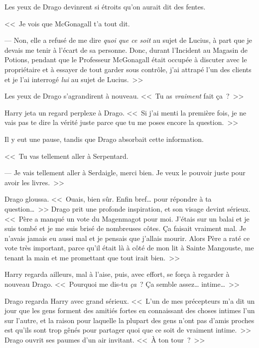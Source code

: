 Les yeux de Drago devinrent si étroits qu'on aurait dit des fentes.

<<~Je vois que McGonagall t'a tout dit.

--- Non, elle a refusé de me dire \emph{quoi que ce soit} au sujet de Lucius, à part que je devais me tenir à l'écart de sa personne. Donc, durant l'Incident au Magasin de Potions, pendant que le Professeur McGonagall était occupée à discuter avec le propriétaire et à essayer de tout garder sous contrôle, j'ai attrapé l'un des clients et je l'ai interrogé \emph{lui} au sujet de Lucius.~>>

Les yeux de Drago s'agrandirent à nouveau. <<~Tu as \emph{vraiment} fait ça~?~>>

Harry jeta un regard perplexe à Drago. <<~Si j'ai menti la première fois, je ne vais pas te dire la vérité juste parce que tu me poses encore la question.~>>

Il y eut une pause, tandis que Drago absorbait cette information.

<<~Tu vas tellement aller à Serpentard.

--- Je vais tellement aller à Serdaigle, merci bien. Je veux le pouvoir juste pour avoir les livres.~>>

Drago gloussa. <<~Ouais, bien sûr. Enfin bref… pour répondre à ta question…~>> Drago prit une profonde inspiration, et son visage devint sérieux. <<~Père a manqué un vote du Magenmagot pour moi. J'étais sur un balai et je suis tombé et je me suis brisé de nombreuses côtes. Ça faisait vraiment mal. Je n'avais jamais eu aussi mal et je pensais que j'allais mourir. Alors Père a raté ce vote très important, parce qu'il était là à côté de mon lit à Sainte Mangouste, me tenant la main et me promettant que tout irait bien.~>>

Harry regarda ailleurs, mal à l'aise, puis, avec effort, se força à regarder à nouveau Drago. <<~Pourquoi me dis-tu \emph{ça}~? Ça semble assez… intime…~>>

Drago regarda Harry avec grand sérieux. <<~L'un de mes précepteurs m'a dit un jour que les gens forment des amitiés fortes en connaissant des choses intimes l'un sur l'autre, et la raison pour laquelle la plupart des gens n'ont pas d'amis proches est qu'ils sont trop gênés pour partager quoi que ce soit de vraiment intime.~>> Drago ouvrit ses paumes d'un air invitant. <<~À ton tour~?~>>

